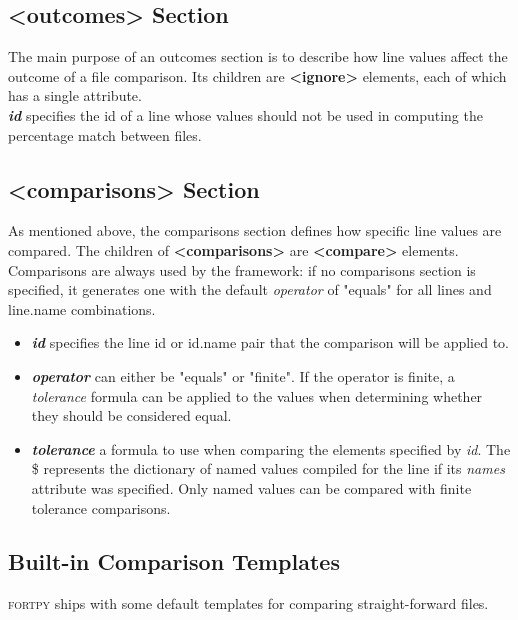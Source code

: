 \documentclass[paper=a4, fontsize=11pt]{scrartcl} %
\numberwithin{equation}{section} %
\numberwithin{figure}{section} %
\numberwithin{table}{section} %
\begin{document}
\subsection{<outcomes> Section}

The main purpose of an outcomes section is to describe how line values affect the outcome of
a file comparison. Its children are \textbf{<ignore>} elements, each of which has a single
attribute.\\

\textbf{\textit{id}} specifies the id of a line whose values should not be used in computing
the percentage match between files.

\subsection{<comparisons> Section}

As mentioned above, the comparisons section defines how specific line values are compared.
The children of \textbf{<comparisons>} are \textbf{<compare>} elements. Comparisons are
always used by the framework: if no comparisons section is specified, it generates one with
the default \textit{operator} of "equals" for all lines and line.name combinations.

\begin{itemize}
\item \textbf{\textit{id}} specifies the line id or id.name pair that the comparison will be
applied to.
\item \textbf{\textit{operator}} can either be "equals" or "finite". If the operator is
finite, a \textit{tolerance} formula can be applied to the values when determining whether
they should be considered equal.
\item \textbf{\textit{tolerance}} a formula to use when comparing the elements specified
by \textit{id}. The \$ represents the dictionary of named values compiled for the line
if its \textit{names} attribute was specified. Only named values can be compared with
finite tolerance comparisons.
\end{itemize}

\subsection{Built-in Comparison Templates}

\textsc{fortpy} ships with some default templates for comparing straight-forward files.\\
\end{document}
